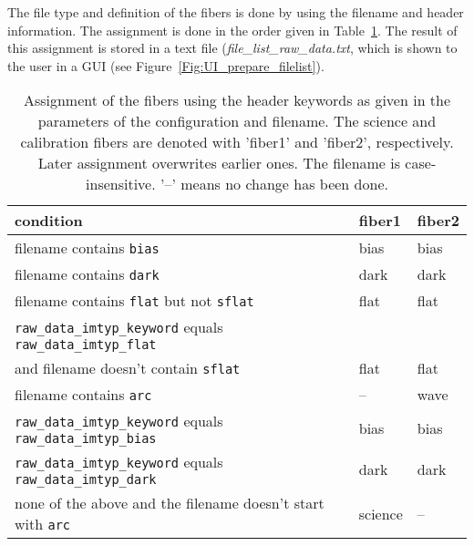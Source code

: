 \documentclass[10pt,a4paper]{article}
\begin{document}
\noindent The file type and definition of the fibers is done by using the filename and header information. The assignment is done in the order given in Table~\ref{Tab:fiber_definition}. The result of this assignment is stored in a text file (\textit{file\_list\_raw\_data.txt}, which is shown to the user in a GUI (see Figure~\ref{Fig:UI_prepare_filelist}). %
\begin{table}
 \caption{Assignment of the fibers using the header keywords as given in the parameters of the configuration and filename. The science and calibration fibers are denoted with 'fiber1' and 'fiber2', respectively. Later assignment overwrites earlier ones. The filename is case-insensitive. '--' means no change has been done.}
 \label{Tab:fiber_definition}
 \begin{tabular}{l l l}
 \small
 condition 															& fiber1 & fiber2 \\
 \hline
 filename contains \verb|bias|										& bias	& bias \\
 filename contains \verb|dark|										& dark	& dark \\
 filename contains \verb|flat| but not \verb|sflat| 				& flat	& flat \\
 \verb|raw_data_imtyp_keyword| equals \verb|raw_data_imtyp_flat| 	&       & \\
 \hspace{1cm} and filename doesn't contain \verb|sflat| 				& flat  & flat \\
 filename contains \verb|arc|						   				& -- 	& wave \\
 \verb|raw_data_imtyp_keyword| equals \verb|raw_data_imtyp_bias| 	& bias	& bias \\
 \verb|raw_data_imtyp_keyword| equals \verb|raw_data_imtyp_dark| 	& dark	& dark \\
 none of the above and the filename doesn't start with \verb|arc|  & science & --   \\
 \end{tabular}
\end{table}
\end{document}
